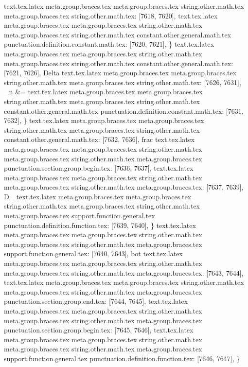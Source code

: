 {{{{{{{{{{{{{{{{{{{{{{{{{{{{{{{{{{{{{{{{{{{{{{{{{{{{{{{{{{{{{{{{{{{{{{{{{{{{{{{{{{{{{{{{{{{{{{{{{{{{{{{{{{{{{{{{{{{{{{{{{{{{{{{{{{{{{{{{{{{{{{{{{{{{{{{{{{{{{{{{{{{{{{{{{{{{{{{{{{{{{{{{{{{{{{{{{{{{{{{{{{{{{{{{{{{}
text.tex.latex meta.group.braces.tex meta.group.braces.tex string.other.math.tex meta.group.braces.tex string.other.math.tex: [7618, 7620], {  }
text.tex.latex meta.group.braces.tex meta.group.braces.tex string.other.math.tex meta.group.braces.tex string.other.math.tex constant.other.general.math.tex punctuation.definition.constant.math.tex: [7620, 7621], {\}
text.tex.latex meta.group.braces.tex meta.group.braces.tex string.other.math.tex meta.group.braces.tex string.other.math.tex constant.other.general.math.tex: [7621, 7626], {Delta}
text.tex.latex meta.group.braces.tex meta.group.braces.tex string.other.math.tex meta.group.braces.tex string.other.math.tex: [7626, 7631], {_n &=}
text.tex.latex meta.group.braces.tex meta.group.braces.tex string.other.math.tex meta.group.braces.tex string.other.math.tex constant.other.general.math.tex punctuation.definition.constant.math.tex: [7631, 7632], {\}
text.tex.latex meta.group.braces.tex meta.group.braces.tex string.other.math.tex meta.group.braces.tex string.other.math.tex constant.other.general.math.tex: [7632, 7636], {frac}
text.tex.latex meta.group.braces.tex meta.group.braces.tex string.other.math.tex meta.group.braces.tex string.other.math.tex meta.group.braces.tex punctuation.section.group.begin.tex: [7636, 7637], {{}
text.tex.latex meta.group.braces.tex meta.group.braces.tex string.other.math.tex meta.group.braces.tex string.other.math.tex meta.group.braces.tex: [7637, 7639], {D_}
text.tex.latex meta.group.braces.tex meta.group.braces.tex string.other.math.tex meta.group.braces.tex string.other.math.tex meta.group.braces.tex support.function.general.tex punctuation.definition.function.tex: [7639, 7640], {\}
text.tex.latex meta.group.braces.tex meta.group.braces.tex string.other.math.tex meta.group.braces.tex string.other.math.tex meta.group.braces.tex support.function.general.tex: [7640, 7643], {bot}
text.tex.latex meta.group.braces.tex meta.group.braces.tex string.other.math.tex meta.group.braces.tex string.other.math.tex meta.group.braces.tex: [7643, 7644], { }
text.tex.latex meta.group.braces.tex meta.group.braces.tex string.other.math.tex meta.group.braces.tex string.other.math.tex meta.group.braces.tex punctuation.section.group.end.tex: [7644, 7645], {}}
text.tex.latex meta.group.braces.tex meta.group.braces.tex string.other.math.tex meta.group.braces.tex string.other.math.tex meta.group.braces.tex punctuation.section.group.begin.tex: [7645, 7646], {{}
text.tex.latex meta.group.braces.tex meta.group.braces.tex string.other.math.tex meta.group.braces.tex string.other.math.tex meta.group.braces.tex support.function.general.tex punctuation.definition.function.tex: [7646, 7647], {\}
}}}}}}}}}}}}}}}}}}}}}}}}}}}}}}}}}}}}}}}}}}}}}}}}}}}}}}}}}}}}}}}}}}}}}}}}}}}}}}}}}}}}}}}}}}}}}}}}}}}}}}}}}}}}}}}}}}}}}}}}}}}}}}}}}}}}}}}}}}}}}}}}}}}}}}}}}}}}}}}}}}}}}}}}}}}}}}}}}}}}}}}}}}}}}}}}}}}}}}}}}}}}}}}}}}}}}}}

